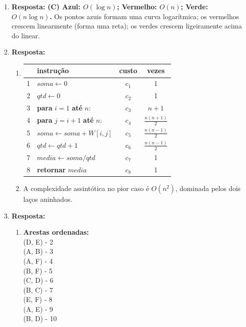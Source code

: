 \documentclass[12pt,a4paper]{article}
\begin{document}
\begin{enumerate}
\item \textbf{Resposta: (C) Azul: $O(\log n)$; Vermelho: $O(n)$; Verde: $O(n \log n)$.}
Os pontos azuis formam uma curva logarítmica; os vermelhos crescem linearmente (forma uma reta); os verdes crescem ligeiramente acima do linear.

\item \textbf{Resposta:}
\begin{enumerate}[label=\alph*)]
    \item 
    \begin{tabular}{llcc}
        \hline
        & \textbf{instrução} & \textbf{custo} & \textbf{vezes} \\
        \hline
        1 & $soma \leftarrow 0$ & $c_1$ & 1 \\
        2 & $qtd \leftarrow 0$ & $c_2$ & 1 \\
        3 & \textbf{para} $i = 1$ \textbf{até} $n$: & $c_3$ & $n+1$ \\
        4 & \quad \textbf{para} $j = i+1$ \textbf{até} $n$: & $c_4$ & $\frac{n(n+1)}{2}$ \\
        5 & \quad \quad $soma \leftarrow soma + W[i,j]$ & $c_5$ & $\frac{n(n-1)}{2}$ \\
        6 & \quad \quad $qtd \leftarrow qtd + 1$ & $c_6$ & $\frac{n(n-1)}{2}$ \\
        7 & $media \leftarrow soma / qtd$ & $c_7$ & 1 \\
        8 & \textbf{retornar} $media$ & $c_8$ & 1 \\
        \hline
    \end{tabular}
    \item A complexidade assintótica no pior caso é \textbf{$O(n^2)$}, dominada pelos dois laços aninhados.
\end{enumerate}

\item \textbf{Resposta:}
\begin{enumerate}[label=\alph*)]
    \item \textbf{Arestas ordenadas:} \\
    (D, E) - 2 \\
    (A, B) - 3 \\
    (A, F) - 4 \\
    (B, F) - 5 \\
    (C, D) - 6 \\
    (B, C) - 7 \\
    (E, F) - 8 \\
    (A, E) - 9 \\
    (B, D) - 10
    

\end{enumerate}
\end{enumerate}
\end{document}
